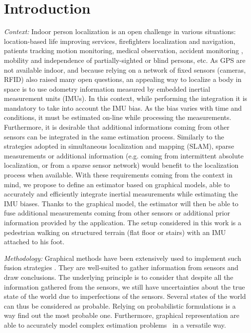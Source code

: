 
\section{Introduction}\label{sec:intro}

\textit{Context: }
Indoor person localization is an open challenge in various situations: location-based life improving services,
firefighters localization and navigation, patients tracking 
motion monitoring, medical observation, accident monitoring \cite{pourhomayoun2012spatial}, mobility and independence of partially-sighted or blind persons, etc.
As GPS are not available indoor, and because relying on a network of fixed sensors (cameras, RFID) also raised many open questions, an appealing way to localize a body in space is to use odometry information measured by embedded inertial measurement units (IMUs).
In this context, while performing the integration it is mandatory to take into account the IMU bias.
As the bias varies with time and conditions, it must be estimated on-line while processing the measurements.
Furthermore, it is desirable that additional informations coming from other sensors can be integrated in the same estimation process.
Similarly to the strategies adopted in simultaneous localization and mapping (SLAM), sparse measurements or additional information (e.g. coming from intermittent absolute localization, or from a sparse sensor network) would benefit to the localization process when available.
With these requirements coming from the context in mind, we propose to define an estimator based on graphical models, able to accurately and efficiently integrate inertial measurements while estimating the IMU biases. Thanks to the graphical model, the estimator will then be able to fuse additional measurements coming from other sensors or additional prior information provided by the application.
The setup considered in this work  is a pedestrian walking on structured terrain (flat floor or stairs) with an IMU attached to his foot.


\textit{Methodology: }
Graphical methods have been extensively used to implement such fusion strategies \cite{Thrun:ijrr:2006,Kaess:itro:2008}.
They are well-suited to gather information from sensors
and draw conclusions. The underlying principle is to consider that despite all the information gathered from the sensors, we still have uncertainties about the true state of the world due to imperfections of the sensors.
Several states of the world can thus be considered as probable.
Relying on probabilistic formulations is a way find out the most probable one. Furthermore, graphical representation are able to accurately model 
complex estimation problems~\cite{koller2009probabilistic} in a versatile way. 

